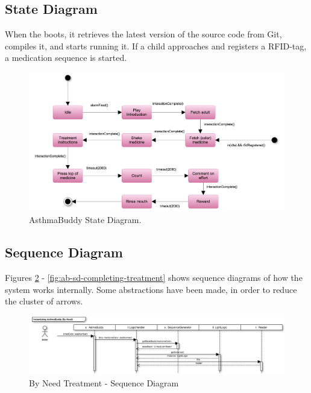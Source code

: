 \subsection{State Diagram}
When the \rpi{} boots, it retrieves the latest version of the source code from Git, compiles it, and starts running it. If a child approaches \buddy{} and registers a RFID-tag, a medication sequence is started.  

\begin{figure}[H] 
	\centering
		\includegraphics[width=0.6\paperwidth]{Pictures/statediagram.png}
	\caption{AsthmaBuddy State Diagram.}
	\label{fig:asthmabuddy_statediagram}
\end{figure}

\subsection{Sequence Diagram}
Figures \ref{fig:ab-sd-byneed} - \ref{fig:ab-sd-completing-treatment} shows sequence diagrams of how the system works internally. Some abstractions have been made, in order to reduce the cluster of arrows. 

\begin{figure}
	\centering
		\includegraphics[scale=0.6]{Pictures/sd/sd-byneed.png}
	\caption{By Need Treatment - Sequence Diagram}
	\label{fig:ab-sd-byneed}
\end{figure}

